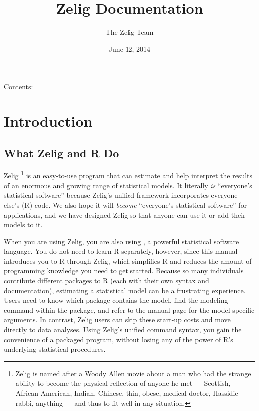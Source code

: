 \documentclass[letterpaper,10pt,english]{sphinxmanual}
\title{Zelig Documentation}
\date{June 12, 2014}
\author{The Zelig Team}
\begin{document}
\maketitle
\tableofcontents
{}\label{index::doc}


Contents:


\chapter{Introduction}
\label{1_introduction:introduction}\label{1_introduction:welcome-to-zelig-s-documentation}\label{1_introduction::doc}

\section{What Zelig and R Do}
\label{1_introduction:what-zelig-and-r-do}
Zelig \footnote{
Zelig is named after a Woody Allen movie about a man who had the
strange ability to become the physical reflection of anyone he met —
Scottish, African-American, Indian, Chinese, thin, obese, medical
doctor, Hassidic rabbi, anything — and thus to fit well in any
situation.
} is an easy-to-use program that can estimate and help
interpret the results of an enormous and growing range of statistical
models. It literally \emph{is} “everyone’s statistical software” because
Zelig’s unified framework incorporates everyone else’s (R) code. We also
hope it will \emph{become} “everyone’s statistical software” for
applications, and we have designed Zelig so that anyone can use it or
add their models to it.

When you are using Zelig, you are also using , a powerful statistical
software language. You do not need to learn R separately, however, since
this manual introduces you to R through Zelig, which simplifies R and
reduces the amount of programming knowledge you need to get started.
Because so many individuals contribute different packages to R (each
with their own syntax and documentation), estimating a statistical model
can be a frustrating experience. Users need to know which package
contains the model, find the modeling command within the package, and
refer to the manual page for the model-specific arguments. In contrast,
Zelig users can skip these start-up costs and move directly to data
analyses. Using Zelig’s unified command syntax, you gain the convenience
of a packaged program, without losing any of the power of R’s underlying
statistical procedures.
\end{document}
